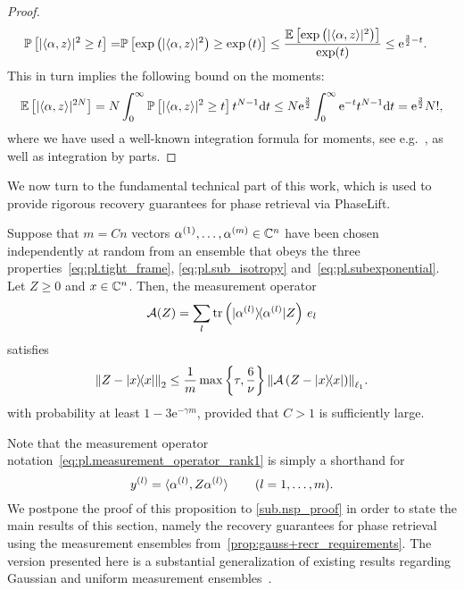 \begin{proof}
  \begin{align}
    \mathbb{P} \left[ | \langle \alpha, z \rangle|^2 \geq t \right]
    =& \mathbb{P} \left[ \exp \left( | \langle  \alpha, z \rangle|^2 \right) \geq \exp \left( t \right) \right]
    \leq \frac{ \mathbb{E} \left[ \exp \left( | \langle \alpha,  z \rangle|^2 \right) \right]}{\exp (t)} \leq \mathrm{e}^{\frac{3}{2}-t}.
  \end{align}
  This in turn implies the following bound on the moments:
  \begin{align}
    \mathbb{E} \left[ | \langle  \alpha, z \rangle|^{2N} \right]
    =  N \int_0^\infty \mathbb{P}\left[ | \langle  \alpha, z \rangle|^2\geq t \right] t^{N-1} \mathrm{d}t \leq N \mathrm{e}^{\frac{3}{2}} \int_0^\infty \mathrm{e}^{-t} t^{N-1} \mathrm{d}t
    = \mathrm{e}^{\frac{3}{2}} N!,
  \end{align}
  where we have used a well-known integration formula for moments, see e.g.\ \cite[Prop.~7.1]{Foucart_2013_Mathematical}, as well as integration by parts.
\end{proof}


We now turn to the fundamental technical part of this work, which is used to provide rigorous recovery guarantees for phase retrieval via PhaseLift.

\begin{proposition}%
  \label{prop:pl.nsp}
  Suppose that $m = Cn$ vectors $\alpha^{(1)},\ldots,\alpha^{(m)} \in \mathbb{C}^n$ have been chosen independently at random from an ensemble that obeys the three properties~\eqref{eq:pl.tight_frame}, \eqref{eq:pl.sub_isotropy} and~\eqref{eq:pl.subexponential}.
  Let $Z\geq 0$ and $x \in {\mathbb{C}}^n$.
  Then, the measurement operator
  \[
    \label{eq:pl.measurement_operator_rank1}
    \mathcal{A}(Z) = \sum_l \tr \left(\ketbra{\alpha\ind{l}}  Z\right) \, {e_l}
  \]
  satisfies
  \[
    \label{eq:pl.rec_guarantee}
    \Fnorm{Z - \ketbra{x}}
    \leq \frac{1}{m} \max \left\{ \tau, \frac{6}{\nu} \right\}  \Norm{\mathcal{A}\left( Z - \ketbra{x} \right)}_{\ell_1}.
  \]
  with probability at least $1- 3\mathrm{e}^{-\gamma m}$, provided that $C >1$ is sufficiently large.
\end{proposition}

Note that the measurement operator notation~\eqref{eq:pl.measurement_operator_rank1} is simply a shorthand for
\[
  y^{(l)} = \braket{\alpha^{(l)}, Z\alpha^{(l)}} \quad\quad (l=1,\ldots,m).
\]
We postpone the proof of this proposition to \cref{sub.nsp_proof} in order to state the main results of this section, namely the recovery guarantees for phase retrieval using the measurement ensembles from~\cref{prop:gauss+recr_requirements}.
The version presented here is a substantial generalization of existing results regarding Gaussian and uniform measurement ensembles~\cite{Candes_2012_Solving,Demanet_2014_Stable}.

